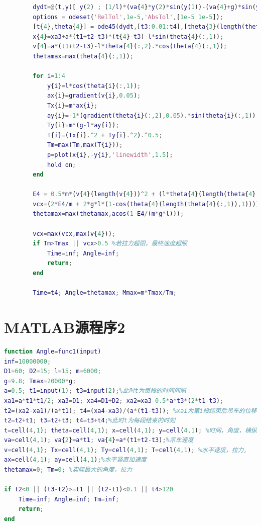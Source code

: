 \documentclass[withoutpreface,bwprint]{cumcmthesis} %
\begin{document}
\begin{appendices}
\begin{lstlisting}[language=matlab]
        %第四段匀速
        dydt=@(t,y)[ y(2) ; (1/l)*(va{4}*y(2)*sin(y(1))-(va{4}+g)*sin(y(1))) ];
        options = odeset('RelTol',1e-5,'AbsTol',[1e-5 1e-5]);
        [t{4},theta{4}] = ode45(dydt,[t3:0.01:t4],[theta{3}(length(theta{3}(:,1)),1) theta{3}(length(theta{3}(:,2)),2)],options);
        x{4}=xa3+a*(t1+t2-t3)*(t{4}-t3)-l*sin(theta{4}(:,1));
        v{4}=a*(t1+t2-t3)-l*theta{4}(:,2).*cos(theta{4}(:,1));
        thetamax=max(theta{4}(:,1));
        
        for i=1:4
            y{i}=l*cos(theta{i}(:,1));
            ax{i}=gradient(v{i},0.05);
            Tx{i}=m*ax{i};
            ay{i}=-1*(gradient(theta{i}(:,2),0.05).*sin(theta{i}(:,1)) + cos(theta{i}(:,1)).*theta{i}(:,2).^2);
            Ty{i}=m*(g-l*ay{i});
            T{i}=(Tx{i}.^2 + Ty{i}.^2).^0.5;
            Tm=max(Tm,max(T{i}));
            p=plot(x{i},-y{i},'linewidth',1.5);
            hold on;
        end
        
        E4 = 0.5*m*(v{4}(length(v{4}))^2 + (l*theta{4}(length(theta{4}(:,2)),2)*sin(theta{4}(length(theta{4}(:,1)),1)))^2);
        vcx=(2*E4/m + 2*g*l*(1-cos(theta{4}(length(theta{4}(:,1)),1))))^0.5;
        thetamax=max(thetamax,acos(1-E4/(m*g*l)));
        
        vcx=max(vcx,max(v{4}));
        if Tm>Tmax || vcx>0.5 %若拉力超限，最终速度超限
            Time=inf; Angle=inf;
            return;
        end
        
        Time=t4; Angle=thetamax; Mmax=m*Tmax/Tm;
     \end{lstlisting}
    \section{MATLAB源程序2}
    \begin{lstlisting}[language=matlab]
        function Angle=func1(input)
inf=10000000;
D1=60; D2=15; l=15; m=6000;
g=9.8; Tmax=20000*g; 
a=0.5; t1=input(1); t3=input(2);%此时t为每段的时间间隔
xa1=a*t1*t1/2; xa3=D1; xa4=D1+D2; xa2=xa3-0.5*a*t3*(2*t1-t3);
t2=(xa2-xa1)/(a*t1); t4=(xa4-xa3)/(a*(t1-t3)); %xai为第i段结束后吊车的位移
t2=t2+t1; t3=t2+t3; t4=t3+t4;%此时t为每段结束的时刻
t=cell(4,1); theta=cell(4,1); x=cell(4,1); y=cell(4,1); %时间，角度，横纵坐标
va=cell(4,1); va{2}=a*t1; va{4}=a*(t1+t2-t3);%吊车速度
v=cell(4,1); Tx=cell(4,1); Ty=cell(4,1); T=cell(4,1); %水平速度，拉力,
ax=cell(4,1); ay=cell(4,1);%水平竖直加速度
thetamax=0; Tm=0; %实际最大的角度，拉力

if t2<0 || (t3-t2)>=t1 || (t2-t1)<0.1 || t4>120
    Time=inf; Angle=inf; Tm=inf;
    return;
end


\end{lstlisting}
\end{appendices}
\end{document}
